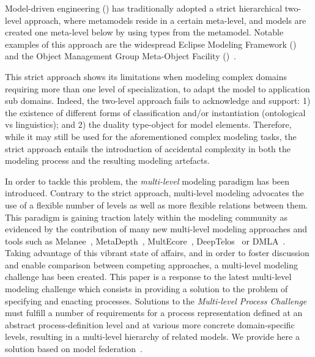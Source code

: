 Model-driven engineering (\MDE) has traditionally adopted a strict hierarchical two-level approach, where metamodels reside in a certain meta-level, and models are created one meta-level below by using types from the metamodel. Notable examples of this approach are the widespread Eclipse Modeling Framework (\EMF)~\parencite{emf} and the Object Management Group Meta-Object Facility (\MOF)~\parencite{omg2013mof}.

This strict approach shows its limitations when modeling complex domains requiring more than one level of specialization, \eg to adapt the model to application sub domains. Indeed, the two-level approach fails to acknowledge and support: 1) the existence of different forms of classification and/or instantiation (\eg ontological vs linguistics); and 2) the duality type-object for model elements. Therefore, while it may still be used for the aforementioned complex modeling tasks, the strict approach entails the introduction of accidental complexity in both the modeling process and the resulting modeling artefacts.

In order to tackle this problem, the \emph{multi-level} modeling paradigm has been introduced. Contrary to the strict approach, multi-level modeling advocates the use of a flexible number of levels as well as more flexible relations between them. This paradigm is gaining traction lately within the modeling community as evidenced by the contribution of many new multi-level modeling approaches and tools such as Melanee~\parencite{melanee}, MetaDepth~\parencite{metadepth}, MultEcore~\parencite{multecore2016}, DeepTelos~\parencite{deeptelos2016} or DMLA~\parencite{dmla2017}. Taking advantage of this vibrant state of affairs, and in order to foster discussion and enable comparison between competing approaches, a multi-level modeling challenge has been created. This paper is a response to the latest multi-level modeling challenge
which consists in providing a solution to the problem of specifying and enacting processes. Solutions to the \emph{Multi-level Process Challenge} must fulfill a number of requirements for a process representation defined at an abstract process-definition level and at various more concrete domain-specific levels, resulting in a multi-level hierarchy of related models. We provide here a solution based on model federation~\parencite{Golra2016-federation}.


